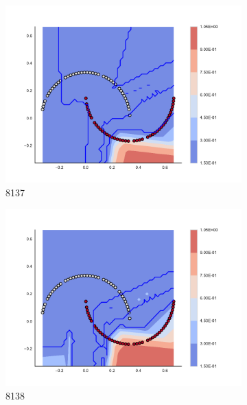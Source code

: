 \begin{figure}[h]
\begin{subfigure}[b]{0.09\textwidth}
    \includegraphics[clip, trim=2.35cm 1.75cm 4.5cm 0cm,width=\textwidth]{img/convergence/8137.pdf}
    \caption{8137}
    \label{fig:convergence_8137}
\end{subfigure}
%
\begin{subfigure}[b]{0.09\textwidth}
    \includegraphics[clip, trim=2.35cm 1.75cm 4.5cm 0cm,width=\textwidth]{img/convergence/8138.pdf}
    \caption{8138}
    \label{fig:convergence_8138}
\end{subfigure}
%
\begin{subfigure}[b]{0.09\textwidth}

\end{subfigure}
\end{figure}
